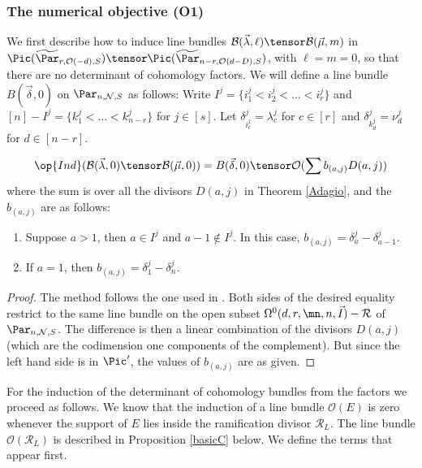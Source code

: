 \subsubsection{The numerical objective (O1)}
We first describe how to induce line bundles $\mathcal{B}(\vec{\lambda},\ell)\tensor\mathcal{B}(\vec{\mu},m)$ in $\Pic (\widetilde{\Par}_{r,\mathcal{O}(-d),S})\tensor  \Pic (\widetilde{\Par}_{n-r,\mathcal{O}(d-D),S})$, with $\ell=m=0$, so that there are no determinant of cohomology factors.
We will define a line bundle $B(\vec{\delta},0)$ on $\Par_{n,\mathcal{N},S}$ as follows: Write
$I^j=\{i^j_1<i^j_2<\dots < i^j_r\}$ and $[n]-I^j=\{k^j_1<\dots < k^j_{n-r}\}$ for $j\in[s]$. Let $\delta^j_{i^j_c} =\lambda^j_c$ for $c\in [r]$ and $\delta^j_{k^j_d} =\nu^j_d$ for $d\in [n-r]$.

\begin{proposition}
\notready\label{formInd}
$$\op{Ind}(\mathcal{B}(\vec{\lambda},0)\tensor\mathcal{B}(\vec{\mu},0)) = B(\vec{\delta},0)\tensor\mathcal{O}(\sum b_{(a,j)}D(a,j))$$
where the sum is over all the divisors $D(a,j)$ in Theorem \ref{Adagio}, and the $b_{(a,j)}$ are as follows:
\begin{enumerate}
\item Suppose $a>1$, then $a\in I^j$ and $a-1\not\in I^j$. In this case, $b_{(a,j)}= \delta^j_{a}-\delta^j_{a-1}$.
\item If $a=1$, then $b_{(a,j)}= \delta^j_{1}-\delta^j_{n}$.
\end{enumerate}
\end{proposition}
\begin{proof}
The method follows the one used in \cite{BKiers}. Both sides of the desired equality restrict to the same line bundle on the open subset ${\Omega}^0(d,r,\mn,n,\vec{I})-\mathcal{R}$ of $\Par_{n,\mathcal{N},S}$. The difference is then a linear combination of the divisors $D(a,j)$ (which are the codimension one components of the complement). But since the left hand side is in $\Pic'$, the values of $b_{(a,j)}$ are as given.
\end{proof}




For the induction of the determinant of cohomology bundles from the factors we proceed as follows.
We know that the induction of  a line bundle $\mathcal{O}(E)$ is zero whenever the support of $E$  lies inside the ramification divisor $\mathcal{R}_L$. The line bundle $\mathcal{O}(\mathcal{R}_L)$ is described in Proposition \ref{basicC} below. We define the terms that appear first.

